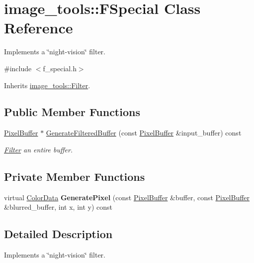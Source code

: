 \hypertarget{classimage__tools_1_1FSpecial}{}\section{image\+\_\+tools\+:\+:F\+Special Class Reference}
\label{classimage__tools_1_1FSpecial}


Implements a \char`\"{}night-\/vision\char`\"{} filter.  




{\ttfamily \#include $<$f\+\_\+special.\+h$>$}



Inherits \hyperlink{classimage__tools_1_1Filter}{image\+\_\+tools\+::\+Filter}.

\subsection*{Public Member Functions}
\begin{DoxyCompactItemize}
\item 
\hyperlink{classimage__tools_1_1PixelBuffer}{Pixel\+Buffer} $\ast$ \hyperlink{classimage__tools_1_1FSpecial_a31941fa317995cabd039469f2481089f}{Generate\+Filtered\+Buffer} (const \hyperlink{classimage__tools_1_1PixelBuffer}{Pixel\+Buffer} \&input\+\_\+buffer) const 
\begin{DoxyCompactList}\small\item\em \hyperlink{classimage__tools_1_1Filter}{Filter} an entire buffer. \end{DoxyCompactList}\end{DoxyCompactItemize}
\subsection*{Private Member Functions}
\begin{DoxyCompactItemize}
\item 
virtual \hyperlink{classimage__tools_1_1ColorData}{Color\+Data} {\bfseries Generate\+Pixel} (const \hyperlink{classimage__tools_1_1PixelBuffer}{Pixel\+Buffer} \&buffer, const \hyperlink{classimage__tools_1_1PixelBuffer}{Pixel\+Buffer} \&blurred\+\_\+buffer, int x, int y) const \hypertarget{classimage__tools_1_1FSpecial_a0b429e2d6bc2ecba6e4e10941d0fd63e}{}\label{classimage__tools_1_1FSpecial_a0b429e2d6bc2ecba6e4e10941d0fd63e}

\end{DoxyCompactItemize}


\subsection{Detailed Description}
Implements a \char`\"{}night-\/vision\char`\"{} filter. 

